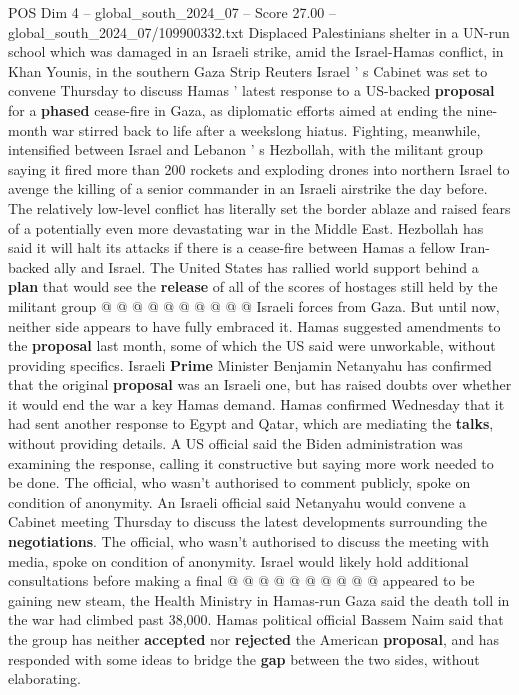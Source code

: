 \begin{textsample}{POS Dim 4 – global\_south\_2024\_07 – Score 27.00 – global\_south\_2024\_07/109900332.txt}  \label{ex:f4_pos_113}
Displaced Palestinians shelter in a UN-run school which was damaged in an Israeli strike, amid the Israel-Hamas conflict, in Khan Younis, in the southern Gaza Strip Reuters Israel ' s Cabinet was set to convene Thursday to discuss Hamas ' latest response to a US-backed \textbf{proposal} for a \textbf{phased} cease-fire in Gaza, as diplomatic efforts aimed at ending the nine-month war stirred back to life after a weekslong hiatus.
Fighting, meanwhile, intensified between Israel and Lebanon ' s Hezbollah, with the militant group saying it fired more than 200 rockets and exploding drones into northern Israel to avenge the killing of a senior commander in an Israeli airstrike the day before.
The relatively low-level conflict has literally set the border ablaze and raised fears of a potentially even more devastating war in the Middle East.
Hezbollah has said it will halt its attacks if there is a cease-fire between Hamas a fellow Iran-backed ally and Israel.
The United States has rallied world support behind a \textbf{plan} that would see the \textbf{release} of all of the scores of hostages still held by the militant group @ @ @ @ @ @ @ @ @ @ Israeli forces from Gaza.
But until now, neither side appears to have fully embraced it.
Hamas suggested amendments to the \textbf{proposal} last month, some of which the US said were unworkable, without providing specifics.
Israeli \textbf{Prime} Minister Benjamin Netanyahu has confirmed that the original \textbf{proposal} was an Israeli one, but has raised doubts over whether it would end the war a key Hamas demand.
Hamas confirmed Wednesday that it had sent another response to Egypt and Qatar, which are mediating the \textbf{talks}, without providing details.
A US official said the Biden administration was examining the response, calling it constructive but saying more work needed to be done.
The official, who wasn't authorised to comment publicly, spoke on condition of anonymity.
An Israeli official said Netanyahu would convene a Cabinet meeting Thursday to discuss the latest developments surrounding the \textbf{negotiations}.
The official, who wasn't authorised to discuss the meeting with media, spoke on condition of anonymity.
Israel would likely hold additional consultations before making a final @ @ @ @ @ @ @ @ @ @ appeared to be gaining new steam, the Health Ministry in Hamas-run Gaza said the death toll in the war had climbed past 38,000.
Hamas political official Bassem Naim said that the group has neither \textbf{accepted} nor \textbf{rejected} the American \textbf{proposal}, and has responded with some ideas to bridge the \textbf{gap} between the two sides, without elaborating.

\end{textsample}
